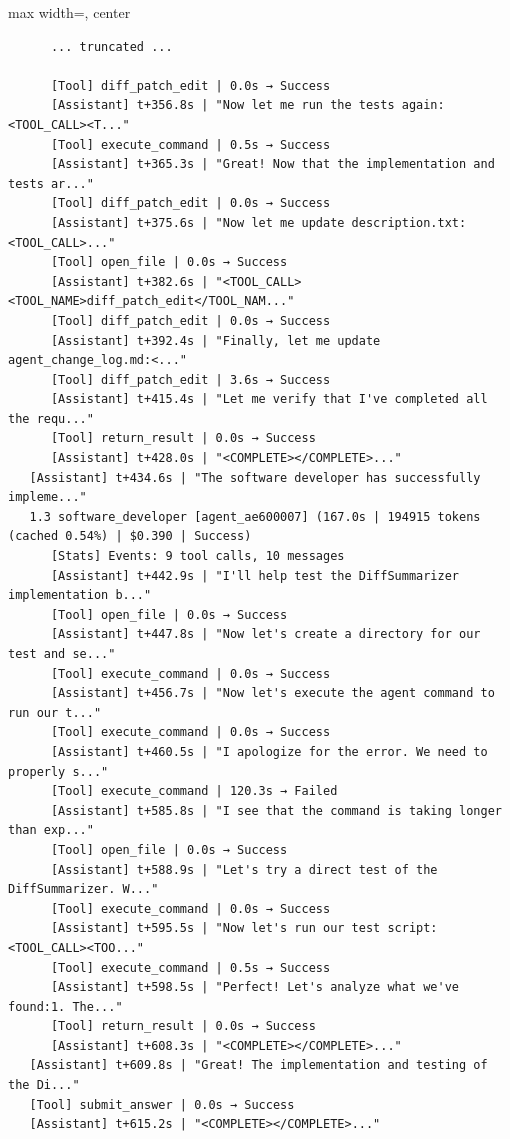 {\begin{adjustbox}{max width=\linewidth, center}
\begin{tracebox}
\begin{verbatim}
      ... truncated ...

      [Tool] diff_patch_edit | 0.0s → Success
      [Assistant] t+356.8s | "Now let me run the tests again:<TOOL_CALL><T..."
      [Tool] execute_command | 0.5s → Success
      [Assistant] t+365.3s | "Great! Now that the implementation and tests ar..."
      [Tool] diff_patch_edit | 0.0s → Success
      [Assistant] t+375.6s | "Now let me update description.txt:<TOOL_CALL>..."
      [Tool] open_file | 0.0s → Success
      [Assistant] t+382.6s | "<TOOL_CALL><TOOL_NAME>diff_patch_edit</TOOL_NAM..."
      [Tool] diff_patch_edit | 0.0s → Success
      [Assistant] t+392.4s | "Finally, let me update agent_change_log.md:<..."
      [Tool] diff_patch_edit | 3.6s → Success
      [Assistant] t+415.4s | "Let me verify that I've completed all the requ..."
      [Tool] return_result | 0.0s → Success
      [Assistant] t+428.0s | "<COMPLETE></COMPLETE>..."
   [Assistant] t+434.6s | "The software developer has successfully impleme..."
   1.3 software_developer [agent_ae600007] (167.0s | 194915 tokens (cached 0.54%) | $0.390 | Success)
      [Stats] Events: 9 tool calls, 10 messages
      [Assistant] t+442.9s | "I'll help test the DiffSummarizer implementation b..."
      [Tool] open_file | 0.0s → Success
      [Assistant] t+447.8s | "Now let's create a directory for our test and se..."
      [Tool] execute_command | 0.0s → Success
      [Assistant] t+456.7s | "Now let's execute the agent command to run our t..."
      [Tool] execute_command | 0.0s → Success
      [Assistant] t+460.5s | "I apologize for the error. We need to properly s..."
      [Tool] execute_command | 120.3s → Failed
      [Assistant] t+585.8s | "I see that the command is taking longer than exp..."
      [Tool] open_file | 0.0s → Success
      [Assistant] t+588.9s | "Let's try a direct test of the DiffSummarizer. W..."
      [Tool] execute_command | 0.0s → Success
      [Assistant] t+595.5s | "Now let's run our test script:<TOOL_CALL><TOO..."
      [Tool] execute_command | 0.5s → Success
      [Assistant] t+598.5s | "Perfect! Let's analyze what we've found:1. The..."
      [Tool] return_result | 0.0s → Success
      [Assistant] t+608.3s | "<COMPLETE></COMPLETE>..."
   [Assistant] t+609.8s | "Great! The implementation and testing of the Di..."
   [Tool] submit_answer | 0.0s → Success
   [Assistant] t+615.2s | "<COMPLETE></COMPLETE>..."
\end{verbatim}
\end{tracebox}
\end{adjustbox}
}

